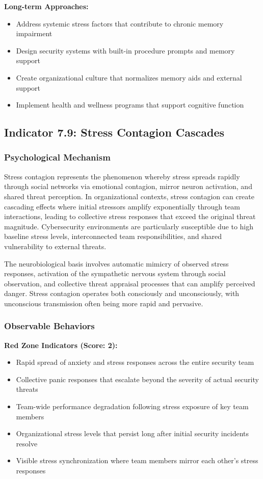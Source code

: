 \documentclass[11pt,a4paper]{article}
\begin{document}
\textbf{Long-term Approaches:}
\begin{itemize}
\item Address systemic stress factors that contribute to chronic memory impairment
\item Design security systems with built-in procedure prompts and memory support
\item Create organizational culture that normalizes memory aids and external support
\item Implement health and wellness programs that support cognitive function
\end{itemize}

\subsection{Indicator 7.9: Stress Contagion Cascades}

\subsubsection{Psychological Mechanism}

Stress contagion represents the phenomenon whereby stress spreads rapidly through social networks via emotional contagion, mirror neuron activation, and shared threat perception\cite{hatfield1994}. In organizational contexts, stress contagion can create cascading effects where initial stressors amplify exponentially through team interactions, leading to collective stress responses that exceed the original threat magnitude\cite{barsade2002}. Cybersecurity environments are particularly susceptible due to high baseline stress levels, interconnected team responsibilities, and shared vulnerability to external threats\cite{contagion2023}.

The neurobiological basis involves automatic mimicry of observed stress responses, activation of the sympathetic nervous system through social observation, and collective threat appraisal processes that can amplify perceived danger\cite{neurobiology2021}. Stress contagion operates both consciously and unconsciously, with unconscious transmission often being more rapid and pervasive\cite{unconscious2022}.

\subsubsection{Observable Behaviors}

\textbf{Red Zone Indicators (Score: 2):}
\begin{itemize}
\item Rapid spread of anxiety and stress responses across the entire security team
\item Collective panic responses that escalate beyond the severity of actual security threats
\item Team-wide performance degradation following stress exposure of key team members
\item Organizational stress levels that persist long after initial security incidents resolve
\item Visible stress synchronization where team members mirror each other's stress responses
\end{itemize}
\end{document}
